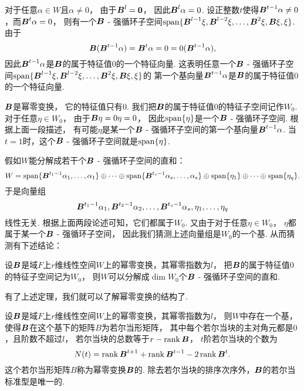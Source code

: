 对于任意\(\alpha \in W\)且\(\alpha\neq0\)，
由于\(\boldsymbol{B}^l=\boldsymbol0\)，
因此\(\boldsymbol{B}^l\alpha=0\).
设正整数\(t\)使得\(\boldsymbol{B}^{t-1}\alpha\neq0\)，而\(\boldsymbol{B}^t\alpha=0\)，
则有一个\(\boldsymbol{B}\) - 强循环子空间\(\operatorname{span}\{\boldsymbol{B}^{l-1}\xi,\boldsymbol{B}^{l-2}\xi,\dotsc,\boldsymbol{B}^2\xi,\boldsymbol{B}\xi,\xi\}\).
由于\begin{equation*}
	\boldsymbol{B}(\boldsymbol{B}^{t-1}\alpha)
	= \boldsymbol{B}^t\alpha
	= 0
	= 0(\boldsymbol{B}^{t-1}\alpha),
\end{equation*}
因此\(\boldsymbol{B}^{t-1}\alpha\)是\(\boldsymbol{B}\)的属于特征值\(0\)的一个特征向量.
这表明任意一个\(\boldsymbol{B}\) - 强循环子空间\(\operatorname{span}\{\boldsymbol{B}^{l-1}\xi,\boldsymbol{B}^{l-2}\xi,\dotsc,\boldsymbol{B}^2\xi,\boldsymbol{B}\xi,\xi\}\)的
第一个基向量\(\boldsymbol{B}^{t-1}\alpha\)是\(\boldsymbol{B}\)的属于特征值\(0\)的一个特征向量.

\(\boldsymbol{B}\)是幂零变换，
它的特征值只有\(0\).
我们把\(\boldsymbol{B}\)的属于特征值\(0\)的特征子空间记作\(W_0\).
对于任意\(\eta \in W_0\)，
由于\(\boldsymbol{B}\eta = 0\eta = 0\)，
因此\(\operatorname{span}\{\eta\}\)是一个\(\boldsymbol{B}\) - 强循环子空间.
根据上面一段描述，
有可能\(\eta\)是某一个\(\boldsymbol{B}\) - 强循环子空间的第一个基向量\(\boldsymbol{B}^{t-1}\alpha\).
当\(t=1\)时，这个\(\boldsymbol{B}\) - 强循环子空间就是\(\operatorname{span}\{\eta\}\).

假如\(W\)能分解成若干个\(\boldsymbol{B}\) - 强循环子空间的直和：\begin{equation*}
	W = \operatorname{span}\{\boldsymbol{B}^{t_1-1}\alpha_1,\dotsc,\alpha_1\}
		\oplus \dotsb
		\oplus \operatorname{span}\{\boldsymbol{B}^{t_s-1}\alpha_s,\dotsc,\alpha_s\}
		\oplus \operatorname{span}\{\eta_1\}
		\oplus \dotsb
		\oplus \operatorname{span}\{\eta_q\}.
\end{equation*}
于是向量组\begin{equation*}
	\boldsymbol{B}^{t_1-1}\alpha_1,
	\boldsymbol{B}^{t_2-1}\alpha_2,
	\dotsc,
	\boldsymbol{B}^{t_s-1}\alpha_s,
	\eta_1,
	\dotsc,
	\eta_q
\end{equation*}线性无关.
根据上面两段论述可知，它们都属于\(W_0\).
又由于对于任意\(\eta \in W_0\)，
\(\eta\)都属于某一个\(\boldsymbol{B}\) - 强循环子空间，
因此我们猜测上述向量组是\(W_0\)的一个基.
从而猜测有下述结论：
\begin{theorem}
设\(\boldsymbol{B}\)是域\(F\)上\(r\)维线性空间\(W\)上的幂零变换，其幂零指数为\(l\)，
把\(\boldsymbol{B}\)的属于特征值\(0\)的特征子空间记为\(W_0\)，
则\(W\)可以分解成\(\dim W_0\)个\(\boldsymbol{B}\) - 强循环子空间的直和.
\end{theorem}

有了上述定理，我们就可以了解幂零变换的结构了.
\begin{theorem}
设\(\boldsymbol{B}\)是域\(F\)上\(r\)维线性空间\(W\)上的幂零变换，其幂零指数为\(l\)，
则\(W\)中存在一个基，使得\(\boldsymbol{B}\)在这个基下的矩阵\(B\)为若尔当形矩阵，
其中每个若尔当块的主对角元都是\(0\)，且阶数不超过\(l\)，
若尔当块的总数等于\(r - \rank\boldsymbol{B}\)，
\(t\)阶若尔当块的个数为\begin{equation}
	N(t) = \rank\boldsymbol{B}^{t+1} + \rank\boldsymbol{B}^{t-1} - 2 \rank\boldsymbol{B}^t.
\end{equation}
\rm
这个若尔当形矩阵\(B\)称为幂零变换\(\boldsymbol{B}\)的.
除去若尔当块的排序次序外，\(\boldsymbol{B}\)的若尔当标准型是唯一的.
\end{theorem}

